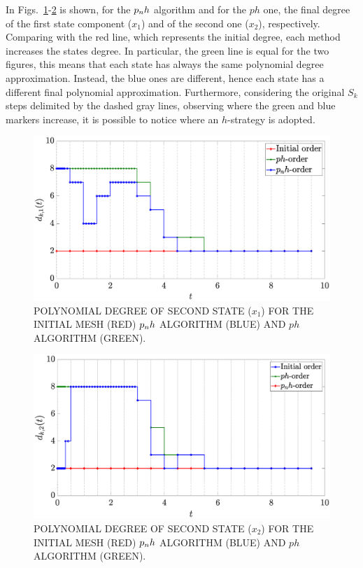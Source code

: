 In Figs.~\ref{fig:pnh1vanderpol}-\ref{fig:pnh2vanderpol} is shown, for the $p_{n}h$ algorithm and for the $ph$ one, the final degree of the first state component ($x_1$) and of the second one ($x_2$), respectively. Comparing with the red line, which represents the initial degree, each method increases the states degree. In particular, the green line is equal for the two figures, this means that each state has always the same polynomial degree approximation. Instead, the blue ones are different, hence each state has a different final polynomial approximation. Furthermore, considering the original $S_k$ steps delimited by the dashed gray lines, observing where the green and blue markers increase, it is possible to notice where an $h$-strategy is adopted.
\begin{figure}
	\centering
	\includegraphics[trim={2cm 0cm 4cm 0cm},clip,width=1.\linewidth]{Img/pnh1_vanderpol}
	\caption{POLYNOMIAL DEGREE OF SECOND STATE ($x_{1}$) FOR THE INITIAL MESH (RED) $p_{n}h$ ALGORITHM (BLUE) AND $ph$ ALGORITHM (GREEN).}
	\label{fig:pnh1vanderpol}
\end{figure}

\begin{figure}
	\centering
	\includegraphics[trim={2cm 0cm 4cm 0cm},clip,width=1.\linewidth]{Img/pnh2_vanderpol}
	\caption{POLYNOMIAL DEGREE OF SECOND STATE ($x_{2}$) FOR THE INITIAL MESH (RED) $p_{n}h$ ALGORITHM (BLUE) AND $ph$ ALGORITHM (GREEN).}
	\label{fig:pnh2vanderpol}
\end{figure}

